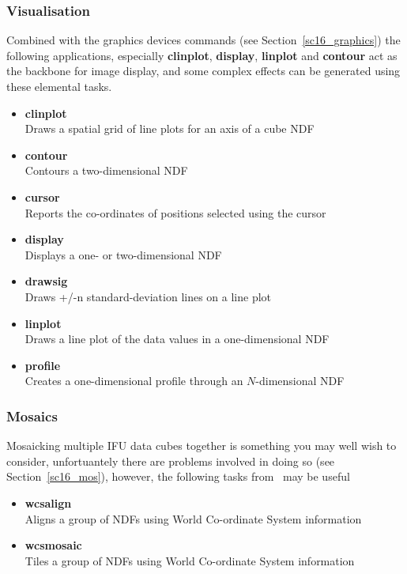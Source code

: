 \documentclass[twoside,11pt]{article}
\newcommand{\htmlref}[2]{#1}
\newcommand{\latex}[1]{#1}
\newcommand{\xref}[3]{#1}
\begin{document}
{\subsubsection{Visualisation}

Combined with the \htmlref{graphics devices commands}{sc16_graphics}\latex{ (see
Section~\ref{sc16_graphics})} the following applications, especially
{\bf clinplot}, {\bf display}, {\bf linplot} and {\bf contour} act as the backbone
for image display, and some complex effects can be generated using
these elemental tasks.

\begin{itemize}
\item{\xref{{\bf clinplot}}{sun95}{CLINPLOT}}\\
Draws a spatial grid of line plots for an axis of a cube NDF  
\item{\xref{{\bf contour}}{sun95}{CONTOUR}}\\
Contours a two-dimensional NDF 
\item{\xref{{\bf cursor}}{sun95}{CURSOR}}\\
Reports the co-ordinates of positions selected using the cursor 
\item{\xref{{\bf display}}{sun95}{DISPLAY}}\\
Displays a one- or two-dimensional NDF 
\item{\xref{{\bf drawsig}}{sun95}{DRAWSIG}}\\
Draws +/-n standard-deviation lines on a line plot 
\item{\xref{{\bf linplot}}{sun95}{LINPLOT}}\\
Draws a line plot of the data values in a one-dimensional NDF 
\item{\xref{{\bf profile}}{sun95}{PROFILE}}\\
Creates a one-dimensional profile through an $N$-dimensional NDF 
\end{itemize}  

\subsubsection{Mosaics}

Mosaicking multiple IFU data cubes together is something you may well
wish to consider, unfortuantely there are \htmlref{problems}{sc16_mos}
involved in doing so\latex{ (see Section~\ref{sc16_mos})}, however,
the following tasks from \KAPPA\ may be useful

\begin{itemize}  
\item{\xref{{\bf wcsalign}}{sun95}{WCSALIGN}}\\
Aligns a group of NDFs using World Co-ordinate System information 
\item{\xref{{\bf wcsmosaic}}{sun95}{WCSMOSAIC}}\\
Tiles a group of NDFs using World Co-ordinate System information
\end{itemize}

}
\end{document}
